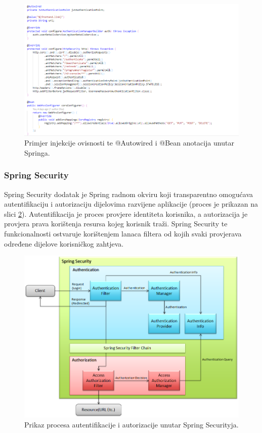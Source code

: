 \documentclass[times, utf8, zavrsni]{fer}
\begin{document}
			\begin{figure}[H]
				\centering
				\includegraphics[width=\linewidth]{pictures/prikazi/Spring.png}
				\caption{Primjer injekcije ovisnosti te @Autowired i @Bean anotacija unutar Springa.}
				\label{fig:spring}
			\end{figure}
			
			\subsubsection{Spring Security}
			Spring Security dodatak je Spring radnom okviru koji transparentno omogućava autentifikaciju  i autorizaciju  dijelovima razvijene aplikacije (proces je prikazan na slici \ref{fig:springsec}). Autentifikacija je proces provjere identiteta korisnika, a autorizacija je provjera prava korištenja resursa kojeg korisnik traži. Spring Security te funkcionalnosti ostvaruje korištenjem lanaca filtera  od kojih svaki provjerava određene dijelove korisničkog zahtjeva.
			\begin{figure}[H]
				\centering
				\includegraphics[width=\linewidth]{pictures/prikazi/SpringSecurity.png}
				\caption{Prikaz procesa autentifikacije i autorizacije unutar Spring Securityja.}
				\label{fig:springsec}
			\end{figure}
			
\end{document}
